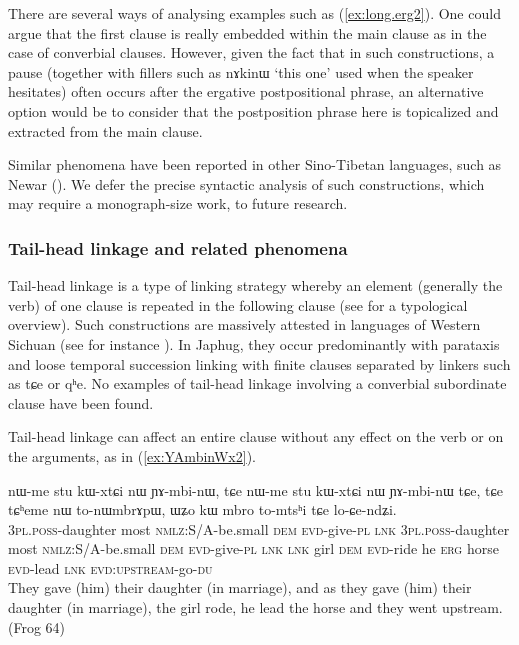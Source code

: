 \documentclass[oldfontcommands,oneside,a4paper,11pt]{article}
\newcommand{\ipa}[1]{{\phon \mbox{#1}}} %
\newcommand{\refb}[1]{(\ref{#1})}
\begin{document}
There are several ways of analysing examples such as \refb{ex:long.erg2}. One could argue that the first clause is really embedded within the main clause as in the case of converbial clauses. However, given the fact that in such constructions, a pause (together with fillers such as \ipa{nɤkinɯ} `this one' used when the speaker hesitates) often occurs after the ergative postpositional phrase, an alternative option would be to consider that the postposition phrase here is topicalized and extracted from the main clause. 

 Similar phenomena have been reported in other Sino-Tibetan languages, such as Newar (\citealt{genetti88syntactic}). We defer the precise syntactic analysis of such constructions, which may require a monograph-size work, to future research. 



\subsubsection{Tail-head linkage and related phenomena}
Tail-head linkage is a type of linking strategy whereby an element (generally the verb) of one clause  is repeated in the following clause (see \citealt{vries05tailhead} for a typological overview). Such constructions are massively attested in languages of Western Sichuan (see for instance \citealt[688-693]{zhangsh13ersu}). In Japhug, they occur predominantly with parataxis and loose temporal succession linking with finite clauses separated by linkers such as \ipa{tɕe} or \ipa{qʰe}. No examples of tail-head linkage involving a converbial subordinate clause have been found.

Tail-head linkage can affect an entire clause without any effect on the verb or on the arguments, as  in \refb{ex:YAmbinWx2}.

\begin{exe}
\ex \label{ex:YAmbinWx2}
\gll
\ipa{nɯ-me} 	\ipa{stu} 	\ipa{kɯ-xtɕi} 	\ipa{nɯ} 	\ipa{ɲɤ-mbi-nɯ,} 	\ipa{tɕe} 	\ipa{nɯ-me} 	\ipa{stu} 	\ipa{kɯ-xtɕi} 	\ipa{nɯ} 	\ipa{ɲɤ-mbi-nɯ} 	\ipa{tɕe,} 	\ipa{tɕe} 	\ipa{tɕʰeme} 	\ipa{nɯ} 	\ipa{to-nɯmbrɤpɯ,} 	\ipa{ɯʑo} 	\ipa{kɯ} 	\ipa{mbro} 	\ipa{to-mtsʰi} 	\ipa{tɕe} 	\ipa{lo-ɕe-ndʑi.} \\
\textsc{3pl.poss}-daughter most \textsc{nmlz}:S/A-be.small \textsc{dem} \textsc{evd}-give-\textsc{pl}  \textsc{lnk} \textsc{3pl.poss}-daughter most \textsc{nmlz}:S/A-be.small \textsc{dem} \textsc{evd}-give-\textsc{pl}  \textsc{lnk}  \textsc{lnk} girl \textsc{dem} \textsc{evd}-ride he \textsc{erg} horse \textsc{evd}-lead \textsc{lnk} \textsc{evd:upstream}-go-\textsc{du} \\
\glt They gave (him) their daughter (in marriage), and as they gave (him) their daughter (in marriage),  the girl rode, he lead the horse and they went upstream. (Frog 64)
\end{exe}
\end{document}
